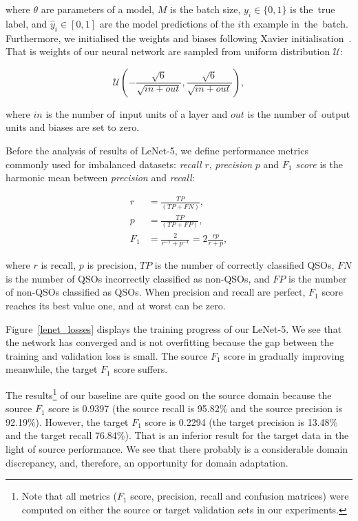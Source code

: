 where \(\theta\) are parameters of a model,
\(M\) is the batch size,
\(y_i \in \{0, 1\}\) is the~true label,
and \(\hat{y}_i \in [0, 1]\) are the model predictions of the \(i\)th example in~the~batch.
Furthermore, we initialised the weights and biases following Xavier initialisation~\cite{glorot2010}.
That is weights of our neural network are sampled from uniform distribution \(\mathcal{U}\):

\begin{equation}
	\mathcal{U}\left(
	-\frac{\sqrt{6}}{\sqrt{\mathit{in} + \mathit{out}}},
	\frac{\sqrt{6}}{\sqrt{\mathit{in} + \mathit{out}}}
	\right),
\end{equation}

where \(\mathit{in}\) is the number of~input units of a layer
and \(\mathit{out}\) is the number of~output units
and biases are set to zero.

Before the analysis of results of LeNet-5,
we define performance metrics commonly used for imbalanced datasets:
\textit{recall} \(r\), \textit{precision} \(p\) and \textit{\(F_1\) score} is the harmonic mean between \textit{precision} and \textit{recall}:

\begin{align}
	r &= \frac{\mathit{TP}}{(\mathit{TP} + \mathit{FN})}, \\
	p &= \frac{\mathit{TP}}{(\mathit{TP} + \mathit{FP})}, \\
	F_1 &= \frac{2}{r^{-1} + p^{-1}} = 2 \frac{r p}{r + p},
\end{align}

where \(r\) is recall, \(p\) is precision,
\(\mathit{TP}\) is the number of correctly classified QSOs,
\(\mathit{FN}\) is the number of QSOs incorrectly classified as non-QSOs,
and \(\mathit{FP}\) is the number of non-QSOs classified as QSOs.
When precision and recall are perfect,
\(F_1\) score reaches its best value one, and at worst can be zero.

Figure~\ref{lenet_losses} displays the training progress of our LeNet-5.
We see that the network has converged and is not overfitting
because the gap between the training and validation loss is small.
The source \(F_1\) score in gradually improving meanwhile, the target \(F_1\) score suffers.

The results\footnote{Note that all metrics (\(F_1\) score, precision, recall and confusion matrices) were computed on either the source or target validation sets in our experiments.} of our baseline are quite good on the source domain
because the source \(F_1\) score is 0.9397
(the source recall is 95.82\% and the source precision is 92.19\%).
However, the target \(F_1\) score is 0.2294
(the target precision is 13.48\% and the target recall 76.84\%).
That is an inferior result for the target data in the light of source performance.
We see that there probably is a considerable domain discrepancy,
and, therefore, an opportunity for domain adaptation.

